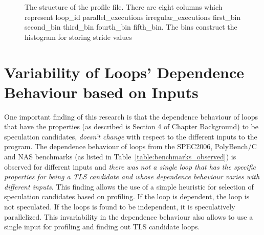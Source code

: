 \documentclass[10pt]{report}          %
\begin{document}
\begin{figure}[h]
\begin{center}
\renewcommand{\figure}{Fig.}
\caption{ The structure of the profile file.  There are eight columns which represent loop\_id  parallel\_executions  irregular\_executions  first\_bin  second\_bin  third\_bin  fourth\_bin  fifth\_bin. The bins construct the histogram for storing stride values}
\end{center}
\label{fig:profile_file}
\end{figure}

\section{Variability of Loops' Dependence Behaviour based on Inputs}

One important finding of this research is that the dependence behaviour of loops that have the properties (as described is Section 4 of Chapter Background) to be speculation candidates, \textit{doesn't change} with respect to the different inputs to the program.  The dependence behaviour of loops from the SPEC2006, PolyBench/C and NAS benchmarks (as listed in  Table~\ref{table:benchmarks_observed}) is observed for different inputs and \textit{there was not a single loop that has the specific properties for being a TLS candidate and whose dependence behaviour varies with different inputs}. This finding allows the use of a simple heuristic for selection of speculation candidates based on profiling.  If the loop is dependent, the loop is not speculated.  If the loops is found to be independent, it is speculatively parallelized.  This invariability in the dependence behaviour also allows to use a single input for profiling and finding out TLS candidate loops.\\
\end{document}
